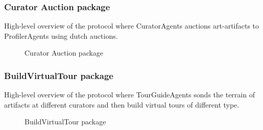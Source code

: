 \documentclass[paper=letter, fontsize=12pt]{article}
\begin{document}
\subsubsection{Curator Auction package}
High-level overview of the protocol where CuratorAgents auctions art-artifacts to ProfilerAgents using dutch auctions.
\begin{figure}[H]
  \begin{center}
    \caption{Curator Auction package}
    \label{fig:curator_auction_template}
  \end{center}
\end{figure}

\subsubsection{BuildVirtualTour package}
High-level overview of the protocol where TourGuideAgents sonds the terrain of artifacts at different curators and then build virtual tours of different type.
\begin{figure}[H]
  \begin{center}
    \caption{BuildVirtualTour package}
    \label{fig:build_virtual_tour_temp}
  \end{center}
\end{figure}
\end{document}
